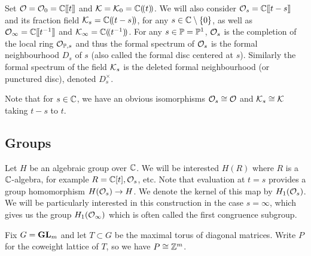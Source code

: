 \documentclass[draft]{article}
\begin{document}
Set $\cO = \cO_0 = \CC\xt$ and $\cK = \cK_0 = \CC\xT$.
We will also consider $\cO_s = \CC\xt[t-s]$ and its fraction field $\cK_s=\CC\xT[t-s]$, for any 
$ s \in \CC\setminus\{0\} $, as well as $ \Oinf = \CC\xt[t^{-1}] $ and $\Kinf = \CC\xT[t^{-1}]$. For any $ s \in \PP = \PP^1$, 
$ \cO_s$ is the completion of the local ring $ \mathcal O_{\PP, s} $ and thus the formal spectrum of $ \cO_s$ is the formal neighbourhood $ D_s$ of $ s $ (also called the formal disc centered at $ s$).  Similarly the formal spectrum of the field $\cK_s$ is the deleted formal neighbourhood (or punctured disc), denoted $ D_s^\times$.

Note that for $ s \in \CC $, we have an obvious isomorphisms  $\cO_s \cong \cO$ and $\cK_s\cong\cK$ taking $ t-s $ to $ t$. 

\subsection{Groups}
Let $H $ be an algebraic group over $ \CC $.  We will be interested $ H(R)$ where $ R $ is a $\CC$-algebra, for example $R = \CC[t], \cO_s$, etc.  Note that evaluation at $ t = s$ provides a group homomorphism $ H(\cO_s) \rightarrow H$.  We denote the kernel of this map by $ H_1(\cO_s)$.  We will be particularly interested in this construction in the case $ s = \infty$, which gives us the group $ H_1(\Oinf)$ which is often called the first congruence subgroup.

Fix $G = \GL_m$ and let $T\subset G$ be the maximal torus of diagonal matrices. 
Write $P$ for the coweight lattice of $T$, so we have $P\cong \ZZ^m$.  
\end{document}
